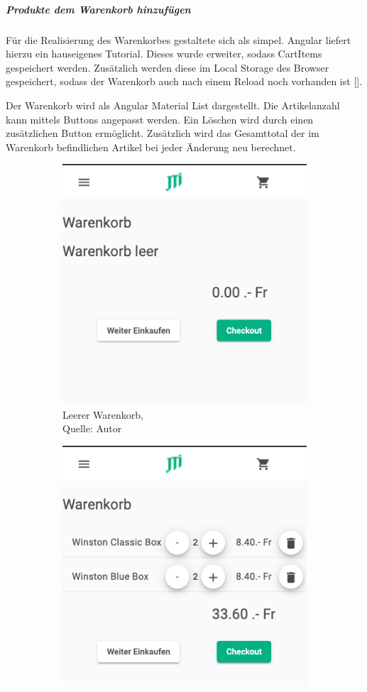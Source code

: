 \subparagraph{Produkte dem Warenkorb hinzufügen}
Für die Realisierung des Warenkorbes gestaltete sich als simpel. Angular liefert hierzu ein hauseigenes Tutorial. Dieses wurde erweiter, sodass CartItems gespeichert werden. Zusätzlich werden diese im Local Storage des Browser gespeichert, sodass der Warenkorb auch nach einem Reload noch vorhanden ist [\cite{cartAngular}].

Der Warenkorb wird als Angular Material List dargestellt. Die Artikelanzahl kann mittels Buttons angepasst werden. Ein Löschen wird durch einen zusätzlichen Button ermöglicht. Zusätzlich wird das Gesamttotal der im Warenkorb befindlichen Artikel bei jeder Änderung neu berechnet. 

\begin{figure}[H]
	\begin{subfigure}[b]{0.4\textwidth}
		\includegraphics[scale=0.4]{images/cartEmpty.PNG}
		\caption[Leerer Warenkorb]{Leerer Warenkorb,\\ Quelle: Autor}
		\label{img: cartEmpty}
	\end{subfigure}
	\hfill
	\begin{subfigure}[b]{0.4\textwidth}
		\includegraphics[scale=0.4]{images/cartFull.PNG}

\end{subfigure}
\end{figure}
